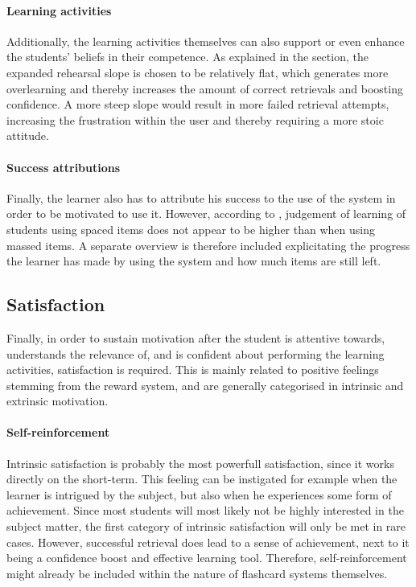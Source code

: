 \paragraph{Learning activities} Additionally, the learning activities themselves can also support or even enhance the students' beliefs in their competence. As explained in the  section, the expanded rehearsal slope is chosen to be relatively flat, which generates more overlearning and thereby increases the amount of correct retrievals and boosting confidence. A more steep slope would result in more failed retrieval attempts, increasing the frustration within the user and thereby requiring a more stoic attitude.

\paragraph{Success attributions} Finally, the learner also has to attribute his success to the use of the system in order to be motivated to use it. However, according to , judgement of learning of students using spaced items does not appear to be higher than when using massed items. A separate overview is therefore included explicitating the progress the learner has made by using the system and how much items are still left.

        
        \subsection{Satisfaction}

Finally, in order to sustain motivation after the student is attentive towards, understands the relevance of, and is confident about performing the learning activities, satisfaction is required. This is mainly related to positive feelings stemming from the reward system, and are generally categorised in intrinsic and extrinsic motivation.

\paragraph{Self-reinforcement} Intrinsic satisfaction is probably the most powerfull satisfaction, since it works directly on the short-term. This feeling can be instigated for example when the learner is intrigued by the subject, but also when he experiences some form of achievement. Since most students will most likely not be highly interested in the subject matter, the first category of intrinsic satisfaction will only be met in rare cases. However, successful retrieval does lead to a sense of achievement, next to it being a confidence boost and effective learning tool. Therefore, self-reinforcement might already be included within the nature of flashcard systems themselves.

